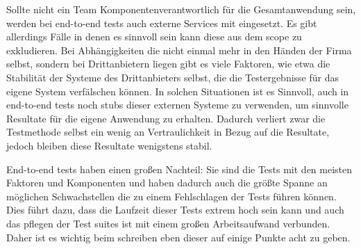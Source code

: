 \documentclass[12pt,a4paper,bibliography=totocnumbered,listof=totocnumbered]{scrartcl}
\begin{document}
Sollte nicht ein Team Komponentenverantwortlich für die Gesamtanwendung sein,  werden bei end-to-end tests auch externe Services mit eingesetzt. Es gibt allerdings Fälle in denen es sinnvoll sein kann diese aus dem scope zu exkludieren. Bei Abhängigkeiten die nicht einmal mehr in den Händen der Firma selbst, sondern bei Drittanbietern liegen gibt es viele Faktoren, wie etwa die Stabilität der Systeme des Drittanbieters selbst, die die Testergebnisse für das eigene System verfälschen können. In solchen Situationen ist es Sinnvoll, auch in end-to-end tests noch stubs dieser externen Systeme zu verwenden, um sinnvolle Resultate für die eigene Anwendung zu erhalten. Dadurch verliert zwar die Testmethode selbst ein wenig an Vertraulichkeit in Bezug auf die Resultate, jedoch bleiben diese Resultate wenigstens stabil.\cite{clemson}

End-to-end tests haben einen großen Nachteil: Sie sind die Tests mit den meisten Faktoren und Komponenten und haben dadurch auch die größte Spanne an möglichen Schwachstellen die zu einem Fehlschlagen der Tests führen können. Dies führt dazu, dass die Laufzeit dieser Tests extrem hoch sein kann und auch das pflegen der Test suites ist mit einem großen Arbeitsaufwand verbunden.\cite{clemson} Daher ist es wichtig beim schreiben eben dieser auf einige Punkte acht zu geben.
\end{document}
